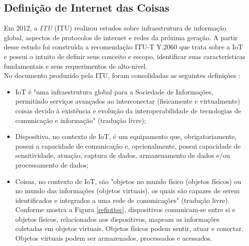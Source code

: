 \subsection{Definição de Internet das Coisas}
	\quad Em 2012, a \textit{\acrlong{ITU}} (\acrshort{ITU}) realizou estudos sobre infraestrutura
	de informação global, aspectos de protocolos de internet e redes da próxima geração.
	A partir desse estudo foi construída a recomendação ITU-T Y.2060 \cite{ITU} que trata sobre a \acrlong{IoT}
	e possui o intuito de definir seus conceito e escopo, identificar
	suas características fundamentais e seus requerimentos de alto-nivel.
  \\ \null
  \quad	No documento produzido pela \acrshort{ITU}, foram consolidadas as seguintes definições \cite{ITU}:
	\begin{itemize}
		\item \acrlong{IoT} é "uma infraestrutura global para a Sociedade de Informações, permitindo serviços avançados ao
		interconectar (fisicamente e virtualmente) coisas devido à existência e evolução da interoperabilidade
	de tecnologias de comunicação e informação" (tradução livre);%
		\item Dispositivo, no contexto de \acrshort{IoT}, é um equipamento que, obrigatoriamente, possui a capacidade
		de comunicação e, opcionalmente, possui capacidade de sensitividade, atuação, captura de dados,
		armazenamento de dados e/ou processamento de dados;
		\item Coisas, no contexto de \acrshort{IoT}, são "objetos
	no mundo físico (objetos físicos) ou no mundo das informações (objetos virtuais), os quais são capazes
	de serem identificados e integrados a uma rede de comunicações" (tradução livre). Conforme mostra a Figura \ref{refiottec}, dispositivos comunicam-se entre si e objetos físicos, relacionados aos dispositivos, mapeam as informações coletadas em objetos virtuais. Objetos físicos podem sentir, atuar e conectar.
	Objetos virtuais podem ser armazenados, processados e acessados.
	\end{itemize}
